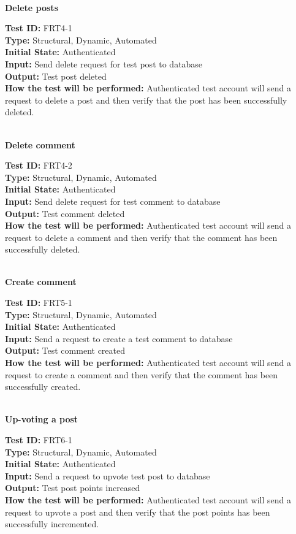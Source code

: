 \documentclass[12pt,fleqn]{article}
\begin{document}
\textbf{\\Delete posts}
\begin{tcolorbox}
\textbf{Test ID:} FRT4-1\\
\textbf{Type:} Structural, Dynamic, Automated\\
\textbf{Initial State:} Authenticated\\
\textbf{Input:} Send delete request for test post to database\\
\textbf{Output:} Test post deleted\\
\textbf{How the test will be performed:} Authenticated test account will send a request to delete a post and then verify that the post has been successfully deleted.
\end{tcolorbox}

\textbf{\\Delete comment}
\begin{tcolorbox}
\textbf{Test ID:} FRT4-2\\
\textbf{Type:} Structural, Dynamic, Automated\\
\textbf{Initial State:} Authenticated\\
\textbf{Input:} Send delete request for test comment to database\\
\textbf{Output:} Test comment deleted\\
\textbf{How the test will be performed:} Authenticated test account will send a request to delete a comment and then verify that the comment has been successfully deleted.
\end{tcolorbox}

\textbf{\\Create comment}
\begin{tcolorbox}
\textbf{Test ID:} FRT5-1\\
\textbf{Type:} Structural, Dynamic, Automated\\
\textbf{Initial State:} Authenticated\\
\textbf{Input:} Send a request to create a test comment to database\\
\textbf{Output:} Test comment created\\
\textbf{How the test will be performed:} Authenticated test account will send a request to create a comment and then verify that the comment has been successfully created.
\end{tcolorbox}

\textbf{\\Up-voting a post}
\begin{tcolorbox}
\textbf{Test ID:} FRT6-1\\
\textbf{Type:} Structural, Dynamic, Automated\\
\textbf{Initial State:} Authenticated\\
\textbf{Input:} Send a request to upvote test post to database\\
\textbf{Output:} Test post points increased\\
\textbf{How the test will be performed:} Authenticated test account will send a request to upvote a post and then verify that the post points has been successfully incremented.
\end{tcolorbox}
\end{document}
